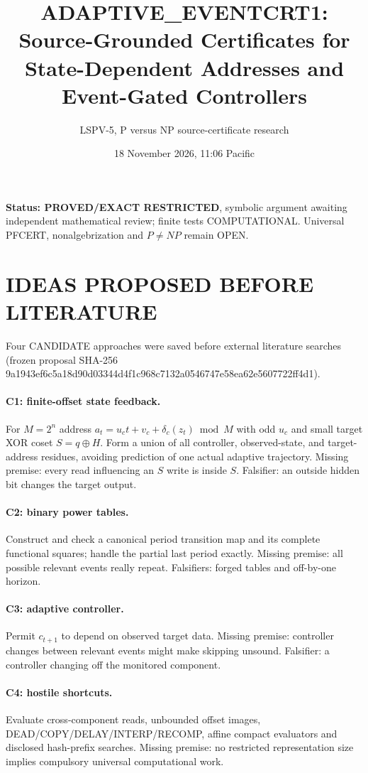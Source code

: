 \documentclass[11pt]{article}
\title{ADAPTIVE\_EVENTCRT1: Source-Grounded Certificates for State-Dependent Addresses and Event-Gated Controllers}
\author{LSPV-5, P versus NP source-certificate research}
\date{18 November 2026, 11:06 Pacific}
\begin{document}
\maketitle
\noindent\textbf{Status: PROVED/EXACT RESTRICTED}, symbolic argument awaiting independent mathematical review; finite tests COMPUTATIONAL. Universal PFCERT, nonalgebrization and $P\ne NP$ remain OPEN.
\section{IDEAS PROPOSED BEFORE LITERATURE}
Four CANDIDATE approaches were saved before external literature searches (frozen proposal SHA-256 9a1943ef6c5a18d90d03344d4f1c968c7132a0546747e58ea62e5607722ff4d1).
\paragraph{C1: finite-offset state feedback.} For $M=2^n$ address $a_t=u_ct+v_c+\delta_c(z_t)\bmod M$ with odd $u_c$ and small target XOR coset $S=q\oplus H$. Form a union of all controller, observed-state, and target-address residues, avoiding prediction of one actual adaptive trajectory. Missing premise: every read influencing an $S$ write is inside $S$. Falsifier: an outside hidden bit changes the target output.
\paragraph{C2: binary power tables.} Construct and check a canonical period transition map and its complete functional squares; handle the partial last period exactly. Missing premise: all possible relevant events really repeat. Falsifiers: forged tables and off-by-one horizon.
\paragraph{C3: adaptive controller.} Permit $c_{t+1}$ to depend on observed target data. Missing premise: controller changes between relevant events might make skipping unsound. Falsifier: a controller changing off the monitored component.
\paragraph{C4: hostile shortcuts.} Evaluate cross-component reads, unbounded offset images, DEAD/COPY/DELAY/INTERP/RECOMP, affine compact evaluators and disclosed hash-prefix searches. Missing premise: no restricted representation size implies compulsory universal computational work.
\end{document}
